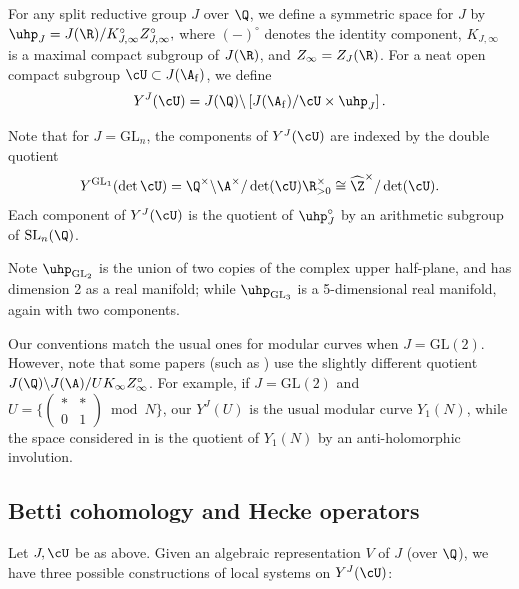 \documentclass[10pt,reqno,a4paper]{amsart}
\newcommand{\stbt}[4]{\left(\begin{smallmatrix}#1 & #2\\#3&#4\end{smallmatrix}\right)}
\newcommand{\subf}{_{\mathrm{f}}}
\newcommand{\SL}{\mathrm{SL}}
\newcommand{\GL}{\mathrm{GL}}
\newcommand{\Zhat}{\widehat{\Z}}
\begin{document}
For any split reductive group $J$ over $\Q$, we define a symmetric space for $J$ by $\uhp_J = J(\R) / K_{J, \infty}^{\circ} Z_{J, \infty}^\circ,$ where $(-)^\circ$ denotes the identity component, $K_{J,\infty}$ is a maximal compact subgroup of $J(\R)$, and $Z_\infty = Z_J(\R)$. For a neat open compact subgroup $\cU \subset J(\A\subf)$, we define
\[
Y^J(\cU) = J(\Q) \backslash \left[ J(\A\subf)/\cU \times \uhp_{J} \right].
\]

Note that for $J = \GL_n$, the components of $Y^J(\cU)$ are indexed by the double quotient
\[
Y^{\GL_1}(\det \cU) = \Q^{\times} \backslash \A^\times / \det(\cU) \R_{>0}^\times \cong \Zhat^\times / \det(\cU).
\]
Each component of $Y^J(\cU)$ is the quotient of $\uhp_J^\circ$ by an arithmetic subgroup of $\SL_n(\Q)$.


Note $\uhp_{\GL_2}$ is the union of two copies of the complex upper half-plane, and has dimension 2 as a real manifold; while $\uhp_{\GL_3}$ is a 5-dimensional real manifold, again with two components.

\begin{remark}
Our conventions match the usual ones for modular curves when $J = \GL(2)$. However, note that some papers (such as \cite{HT17}) use the slightly different quotient $J(\Q) \backslash J(\A) / U K_\infty Z_\infty^\circ$. For example, if $J = \GL(2)$ and $U = \{ \stbt {*}{*}{0}{1} \bmod N\}$, our $Y^J(U)$ is the usual modular curve $Y_1(N)$, while the space considered in \cite{HT17} is the quotient of $Y_1(N)$ by an anti-holomorphic involution.
\end{remark}



\subsection{Betti cohomology and Hecke operators}\label{sec:local systems}

Let $J, \cU$ be as above. Given an algebraic representation $V$ of $J$ (over $\Q$), we have three possible constructions of local systems on $Y^{J}(\cU)$:
\end{document}
